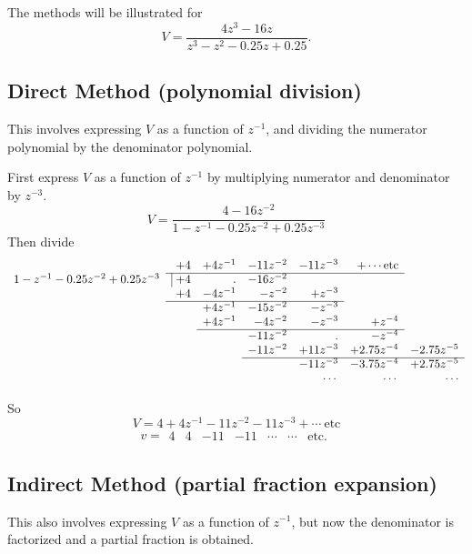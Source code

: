 The methods will be illustrated for \[V=\frac{4z^3 - 16z}{z^3 - z^2 -
  0.25 z + 0.25}.\]

\subsection*{Direct Method (polynomial division)}
This involves expressing $V$ as a function of $z^{-1}$, and
dividing the numerator polynomial by the denominator polynomial.

First express $V$ as a function of $z^{-1}$ by multiplying numerator
and denominator by $z^{-3}$.
\[ V = \frac{4-16z^{-2}}{1-z^{-1}-0.25 z^{-2} + 0.25 z^{-3}} \]
Then divide \[
\begin{array}{rrrrrrr}
   & +4 & +4z^{-1} & -11z^{-2} & -11z^{-3} & +\cdots  \mathrm{etc}& \\ \cline{2-6}
  1-z^{-1}-0.25
z^{-2} + 0.25 z^{-3} &  \vline\ +4 & . & -16z^{-2} &  & &
\\
   & +4 & -4z^{-1} & -z^{-2} & +z^{-3} &  &  \\ \cline{2-5}
   &  &   +4z^{-1} & -15z^{-2} & -z^{-3} &  &  \\
   &  &   +4z^{-1} & - 4z^{-2} & -z^{-3} & +z^{-4} &  \\
   \cline{3-6}
   &  &           & -11z^{-2} & .         &    -z^{-4} &  \\
   &  &           & -11z^{-2} & +11z^{-3} & +2.75z^{-4} & -2.75z^{-5}
   \\\cline{4-7}
  &   &           &           & -11z^{-3} & -3.75z^{-4} &
  +2.75z^{-5} \\
    &   &           &           & \cdots & \cdots &
  \cdots \\
\end{array}
\]

So \[ V = 4 + 4z^{-1} -11 z^{-2} -11z^{-3} + \cdots\
\mathrm{etc}\] \[ v = \begin{array}{ccccccc}
  4 & 4 & -11 & -11 & \cdots & \cdots & \mathrm{etc}.
\end{array} \]

\subsection*{Indirect Method (partial fraction expansion)}
This also involves expressing $V$ as a function of $z^{-1}$, but
now the denominator is factorized and a partial fraction is
obtained.

